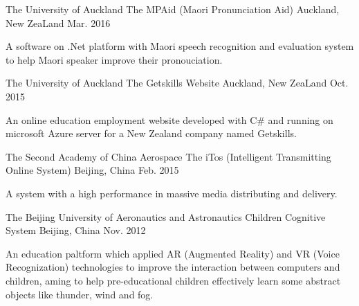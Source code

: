 


\begin{cventries}


\cventry
{The University of Auckland} %
{The MPAid (Maori Pronunciation Aid)} %
{Auckland, New ZeaLand} %
{Mar. 2016} %
{ %
\begin{cvitems}
\item {A software on .Net platform with Maori speech recognition and evaluation system to help Maori speaker improve their
pronouciation.}
\end{cvitems}
}


\cventry
{The University of Auckland} %
{The Getskills Website} %
{Auckland, New ZeaLand} %
{Oct. 2015} %
{ %
\begin{cvitems}
\item {An online education employment website developed with C\# and running on microsoft Azure server for a New Zealand
company named Getskills.}
\end{cvitems}
}


\cventry
{The Second Academy of China Aerospace} %
{The iTos (Intelligent Transmitting Online System)} %
{Beijing, China} %
{Feb. 2015} %
{ %
\begin{cvitems}
\item {A system with a high performance in massive media distributing and delivery.}
\end{cvitems}
}

\cventry
{The Beijing University of Aeronautics and Astronautics} %
{Children Cognitive System} %
{Beijing, China} %
{Nov. 2012} %
{ %
\begin{cvitems}
\item {An education paltform which applied AR (Augmented Reality) and VR (Voice Recognization) technologies to improve the
interaction between computers and children, aming to help pre-educational children effectively learn some abstract objects
like thunder, wind and fog.}
\end{cvitems}
}

\end{cventries}
